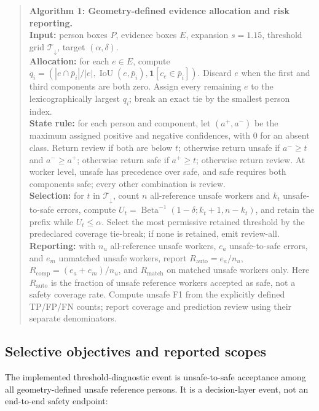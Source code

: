 \documentclass[iicol,pdflatex,sn-mathphys-num]{sn-jnl}
\begin{document}
\begin{quote}
\small
\textbf{Algorithm 1: Geometry-defined evidence allocation and risk reporting.}\\
\textbf{Input:} person boxes $P$, evidence boxes $E$, expansion $s=1.15$, threshold grid $\mathcal{T}_{\downarrow}$, target $(\alpha,\delta)$.\\
\textbf{Allocation:} for each $e\in E$, compute $q_i=(|e\cap\bar p_i|/|e|,\operatorname{IoU}(e,\bar p_i),\mathbf{1}[c_e\in\bar p_i])$. Discard $e$ when the first and third components are both zero. Assign every remaining $e$ to the lexicographically largest $q_i$; break an exact tie by the smallest person index.\\
\textbf{State rule:} for each person and component, let $(a^+,a^-)$ be the maximum assigned positive and negative confidences, with $0$ for an absent class. Return review if both are below $t$; otherwise return unsafe if $a^-\geq t$ and $a^-\geq a^+$; otherwise return safe if $a^+\geq t$; otherwise return review. At worker level, unsafe has precedence over safe, and safe requires both components safe; every other combination is review.\\
\textbf{Selection:} for $t$ in $\mathcal{T}_{\downarrow}$, count $n$ all-reference unsafe workers and $k_t$ unsafe-to-safe errors, compute $U_t=\operatorname{Beta}^{-1}(1-\delta;k_t+1,n-k_t)$, and retain the prefix while $U_t\leq\alpha$. Select the most permissive retained threshold by the predeclared coverage tie-break; if none is retained, emit review-all.\\
\textbf{Reporting:} with $n_u$ all-reference unsafe workers, $e_a$ unsafe-to-safe errors, and $e_m$ unmatched unsafe workers, report $R_{\mathrm{auto}}=e_a/n_u$, $R_{\mathrm{comp}}=(e_a+e_m)/n_u$, and $R_{\mathrm{match}}$ on matched unsafe workers only. Here $R_{\mathrm{auto}}$ is the fraction of unsafe reference workers accepted as safe, not a safety coverage rate. Compute unsafe F1 from the explicitly defined TP/FP/FN counts; report coverage and prediction review using their separate denominators.\\
\end{quote}

\subsection{Selective objectives and reported scopes}

The implemented threshold-diagnostic event is unsafe-to-safe acceptance among all geometry-defined unsafe reference persons. It is a decision-layer event, not an end-to-end safety endpoint:
\end{document}
